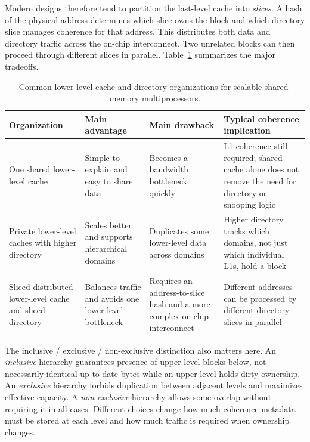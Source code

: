 Modern designs therefore tend to partition the last-level cache into \textit{slices}.
A hash of the physical address determines which slice owns the block and which directory slice manages coherence for that address.
This distributes both data and directory traffic across the on-chip interconnect.
Two unrelated blocks can then proceed through different slices in parallel.
Table~\ref{tab:mp-llc-organizations} summarizes the major tradeoffs.
\begin{table}[t]
    \centering
    \footnotesize
    \renewcommand{\arraystretch}{1.15}
    \begin{tabular}{|>{\raggedright\arraybackslash}p{1.05in}|>{\raggedright\arraybackslash}p{1.35in}|>{\raggedright\arraybackslash}p{1.45in}|>{\raggedright\arraybackslash}p{1.55in}|}
        \hline
        Organization                                              & Main advantage                                         & Main drawback                                                             & Typical coherence implication                                                                            \\
        \hline
        One shared lower-level cache                              & Simple to explain and easy to share data               & Becomes a bandwidth bottleneck quickly & L1 coherence still required; shared cache alone does not remove the need for directory or snooping logic \\
        \hline
        Private lower-level caches with higher directory          & Scales better and supports hierarchical domains & Duplicates some lower-level data across domains & Higher directory tracks which domains, not just which individual L1s, hold a block \\
        \hline
        Sliced distributed lower-level cache and sliced directory & Balances traffic and avoids one lower-level bottleneck & Requires an address-to-slice hash and a more complex on-chip interconnect & Different addresses can be processed by different directory slices in parallel \\
        \hline
    \end{tabular}
    \caption{Common lower-level cache and directory organizations for scalable shared-memory multiprocessors.}
    \label{tab:mp-llc-organizations}
\end{table}

The inclusive / exclusive / non-exclusive distinction also matters here.
An \textit{inclusive} hierarchy guarantees presence of upper-level blocks below, not necessarily identical up-to-date bytes while an upper level holds dirty ownership.
An \textit{exclusive} hierarchy forbids duplication between adjacent levels and maximizes effective capacity.
A \textit{non-exclusive} hierarchy allows some overlap without requiring it in all cases.
Different choices change how much coherence metadata must be stored at each level and how much traffic is required when ownership changes.


